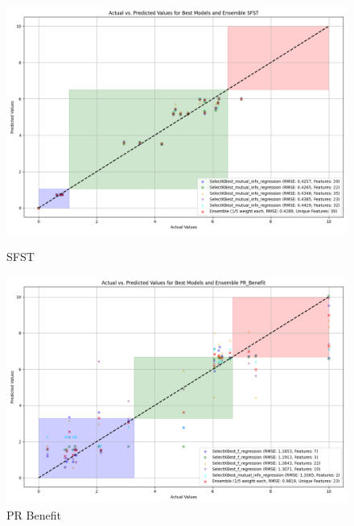 \begin{figure}[H]
    \centering
    \begin{minipage}{0.45\textwidth}
        \centering
        \includegraphics[width=\linewidth]{reg_section_all/images_reg_featred_ensemble/actual_vs_predicted_best_feature_selection_and_ensemble_SFST.png}
        \caption{SFST}
        \label{fig:sfst_reg_featred_best_ensemble}
    \end{minipage}\hfill
    \begin{minipage}{0.45\textwidth}
        \centering
        \includegraphics[width=\linewidth]{reg_section_all/images_reg_featred_ensemble/actual_vs_predicted_best_feature_selection_and_ensemble_PR_Benefit.png}
        \caption{PR Benefit}
        \label{fig:pr_ben_reg_featred_best_ensemble}
    \end{minipage}
\end{figure}

